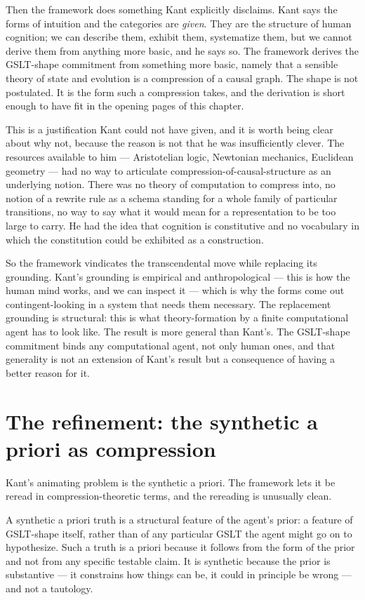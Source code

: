 Then the framework does something Kant explicitly disclaims.
Kant says the forms of intuition and the categories are
\emph{given}.
They are the structure of human cognition; we can describe them,
exhibit them, systematize them, but we cannot derive them from
anything more basic, and he says so.
The framework derives the GSLT-shape commitment from something
more basic, namely that a sensible theory of state and evolution
is a compression of a causal graph.
The shape is not postulated.
It is the form such a compression takes, and the derivation is
short enough to have fit in the opening pages of this chapter.

This is a justification Kant could not have given, and it is worth
being clear about why not, because the reason is not that he was
insufficiently clever.
The resources available to him --- Aristotelian logic, Newtonian
mechanics, Euclidean geometry --- had no way to articulate
compression-of-causal-structure as an underlying notion.
There was no theory of computation to compress into, no notion of a
rewrite rule as a schema standing for a whole family of particular
transitions, no way to say what it would mean for a representation
to be too large to carry.
He had the idea that cognition is constitutive and no vocabulary in
which the constitution could be exhibited as a construction.

So the framework vindicates the transcendental move while replacing
its grounding.
Kant's grounding is empirical and anthropological --- this is how
the human mind works, and we can inspect it --- which is why the
forms come out contingent-looking in a system that needs them
necessary.
The replacement grounding is structural: this is what
theory-formation by a finite computational agent has to look like.
The result is more general than Kant's.
The GSLT-shape commitment binds any computational agent, not only
human ones, and that generality is not an extension of Kant's
result but a consequence of having a better reason for it.

\section{The refinement: the synthetic a priori as compression}
\label{sec:kant-refinement}

Kant's animating problem is the synthetic a priori.
The framework lets it be reread in compression-theoretic terms, and
the rereading is unusually clean.

A synthetic a priori truth is a structural feature of the agent's
prior: a feature of GSLT-shape itself, rather than of any
particular GSLT the agent might go on to hypothesize.
Such a truth is a priori because it follows from the form of the
prior and not from any specific testable claim.
It is synthetic because the prior is substantive --- it constrains
how things can be, it could in principle be wrong --- and not a
tautology.

